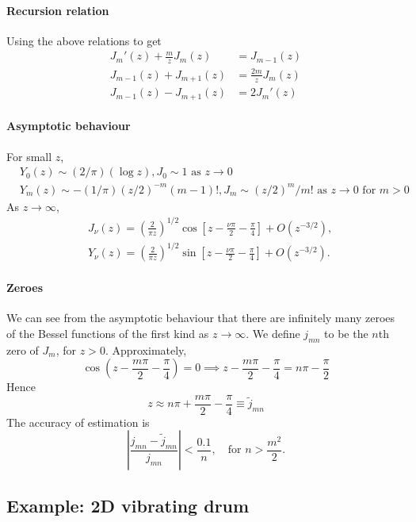 \documentclass[a4paper]{article}
\begin{document}
\paragraph{Recursion relation} Using the above relations to get 
\begin{align*}
    J_m'(z) + \frac{m}{z}J_m(z) &= J_{m-1}(z) \\ 
    J_{m-1}(z) + J_{m+1}(z) &= \frac{2m}{z} J_{m}(z) \\ 
    J_{m-1}(z) - J_{m+1}(z) &= 2 J_m'(z)
\end{align*}

\paragraph{Asymptotic behaviour} For small $z$, 
\[
    \begin{aligned}
        &Y_0(z) \sim(2 / \pi)(\log z), J_0 \sim 1 \text { as } z \rightarrow 0 \\
        &Y_m(z) \sim-(1 / \pi)(z / 2)^{-m}(m-1) !, J_m \sim(z / 2)^m / m ! \text { as } z \rightarrow 0 \text { for } m>0
        \end{aligned}
\]
As $z \rightarrow \infty$,
\[
\begin{aligned}
&J_\nu(z)=\left(\frac{2}{\pi z}\right)^{1 / 2} \cos \left[z-\frac{\nu \pi}{2}-\frac{\pi}{4}\right]+O\left(z^{-3 / 2}\right), \\
&Y_\nu(z)=\left(\frac{2}{\pi z}\right)^{1 / 2} \sin \left[z-\frac{\nu \pi}{2}-\frac{\pi}{4}\right]+O\left(z^{-3 / 2}\right) .
\end{aligned}
\]

\paragraph{Zeroes} We can see from the asymptotic behaviour that there are infinitely many zeroes of the Bessel functions of the first kind as \( z \to \infty \).
We define \( j_{mn} \) to be the \( n \)th zero of \( J_m \), for \( z > 0 \).
Approximately,
\[
	\cos(z - \frac{m \pi}{2} - \frac{\pi}{4}) = 0 \implies z - \frac{m \pi}{2} - \frac{\pi}{4} = n \pi - \frac{\pi}{2}
\]
Hence
\[
	z \approx n \pi + \frac{m \pi}{2} - \frac{\pi}{4} \equiv \tilde j_{mn}
\]
The accuracy of estimation is 
\[
    \left| \frac{j_{mn} - \tilde{j}_{mn}}{j_{mn}} \right| < \frac{0.1}{n},\quad \text{for } n > \frac{m^2}{2}.  
\]

\subsection{Example: 2D vibrating drum}
\end{document}
